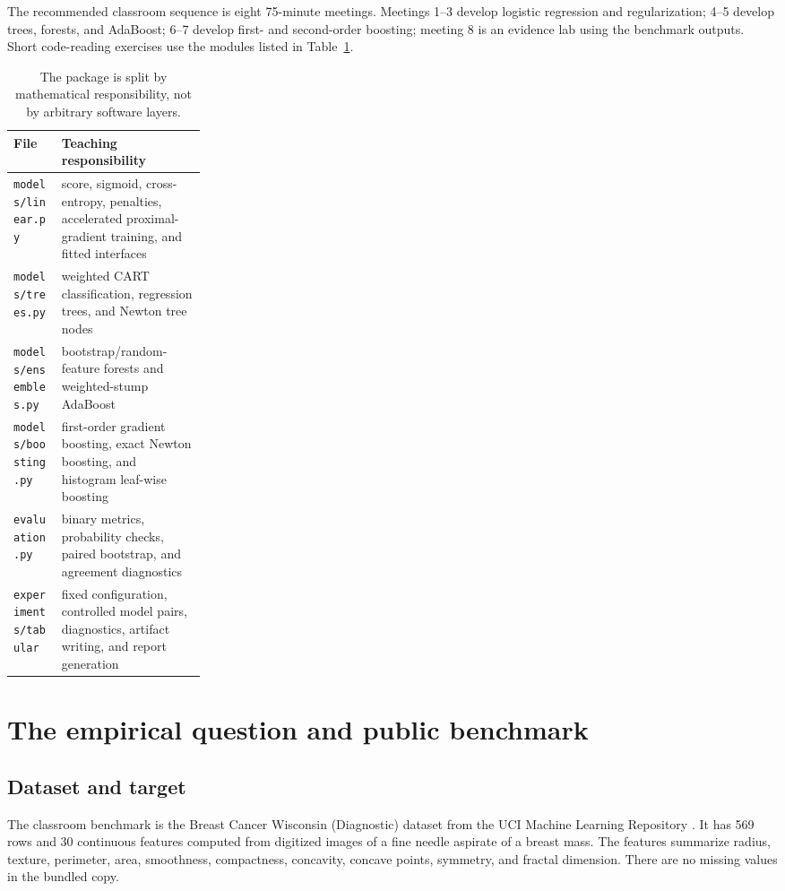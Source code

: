 \documentclass[11pt]{article}
\newcommand{\code}[1]{\texttt{#1}}
\begin{document}
The recommended classroom sequence is eight 75-minute meetings. Meetings 1--3
develop logistic regression and regularization; 4--5 develop trees, forests, and
AdaBoost; 6--7 develop first- and second-order boosting; meeting 8 is an evidence
lab using the benchmark outputs. Short code-reading exercises use the modules
listed in Table~\ref{tab:code-map}.

\begin{table}[H]
\centering
\small
\begin{tabularx}{\linewidth}{p{0.25\linewidth}X}
\toprule
File & Teaching responsibility \\
\midrule
\code{models/linear.py} & score, sigmoid, cross-entropy, penalties, accelerated proximal-gradient training, and fitted interfaces \\
\code{models/trees.py} & weighted CART classification, regression trees, and Newton tree nodes \\
\code{models/ensembles.py} & bootstrap/random-feature forests and weighted-stump AdaBoost \\
\code{models/boosting.py} & first-order gradient boosting, exact Newton boosting, and histogram leaf-wise boosting \\
\code{evaluation.py} & binary metrics, probability checks, paired bootstrap, and agreement diagnostics \\
\code{experiments/tabular} & fixed configuration, controlled model pairs, diagnostics, artifact writing, and report generation \\
\bottomrule
\end{tabularx}
\caption{The package is split by mathematical responsibility, not by arbitrary software layers.}
\label{tab:code-map}
\end{table}

\section{The empirical question and public benchmark}

\subsection{Dataset and target}

The classroom benchmark is the Breast Cancer Wisconsin (Diagnostic) dataset
from the UCI Machine Learning Repository \cite{uci-wdbc}. It has 569 rows and 30
continuous features computed from digitized images of a fine needle aspirate of
a breast mass. The features summarize radius, texture, perimeter, area,
smoothness, compactness, concavity, concave points, symmetry, and fractal
dimension. There are no missing values in the bundled copy.
\end{document}
